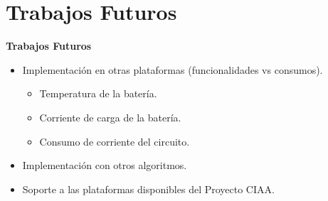 \documentclass[aspectratio=43, handout]{beamer}
\begin{document}
\section{Trabajos Futuros}
\begin{frame}{\textbf{\LARGE{Trabajos Futuros}}}
\fontsize{15pt}{15}\selectfont
	\begin{itemize}
			\item Implementación en otras plataformas (funcionalidades vs consumos).
			\begin{itemize}
			\fontsize{14pt}{14}\selectfont
			\item Temperatura de la batería.
			\item Corriente de carga de la batería.
			\item Consumo de corriente del circuito.
			\end{itemize}
			\vspace{10px}
			\item Implementación con otros algoritmos.
			\vspace{10px}
			\item Soporte a las plataformas disponibles del Proyecto CIAA.
	\end{itemize}	  	
\end{frame}
\end{document}
